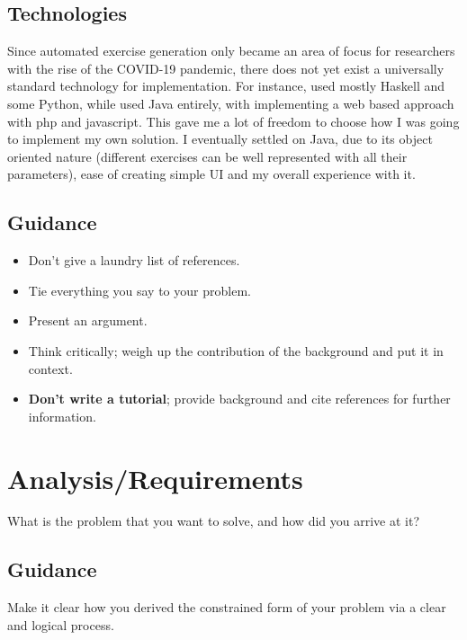 \documentclass{l4proj}
\begin{document}
\section{Technologies}
\label{2.3}
Since automated exercise generation only became an area of focus for researchers with the rise of the COVID-19 pandemic, there does not yet exist a universally standard technology for implementation. For instance, \citet{Hoz21} used mostly Haskell and some Python, while \citet {Esh22} used Java entirely, with \citet{Kot19} implementing a web based approach with php and javascript. This gave me a lot of freedom to choose how I was going to implement my own solution. I eventually settled on Java, due to its object oriented nature (different exercises can be well represented with all their parameters), ease of creating simple UI and my overall experience with it.
\section{Guidance}
\begin{itemize}    
    \item
      Don't give a laundry list of references.
    \item
      Tie everything you say to your problem.
    \item
      Present an argument.
    \item Think critically; weigh up the contribution of the background and put it in context.    
    \item
      \textbf{Don't write a tutorial}; provide background and cite
      references for further information.
\end{itemize}

\chapter{Analysis/Requirements}
What is the problem that you want to solve, and how did you arrive at it?
\section{Guidance}
Make it clear how you derived the constrained form of your problem via a clear and logical process. 

\end{document}
